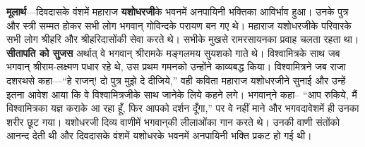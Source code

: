 \begin{sloppypar}\justifying{}
\textbf{मूलार्थ}—दिवदासके वंशमें महाराज \textbf{यशोधरजी}के भवनमें अनपायिनी भक्तिका आविर्भाव हुआ। उनके पुत्र और स्त्री सम्मत होकर सभी लोग भगवान् गोविन्दके परायण बन गए थे। महाराज यशोधरजीके परिवारके सभी लोग श्रीहरि और श्रीहरिदासोंकी सेवा करते थे। सभीके मुखसे राम\-रसायनका प्रवाह चलता रहता था। \textbf{सीतापति को सुजस} अर्थात् वे भगवान् श्रीरामके मङ्गलमय सुयशको गाते थे। विश्वामित्रके साथ जब भगवान् श्रीराम-लक्ष्मण पधार रहे थे, उस प्रथम गमनको उन्होंने काव्यबद्ध किया। विश्वामित्रने जब राजा दशरथसे कहा—“हे राजन्! दो पुत्र मुझे दे दीजिये,” वही कविता महाराज यशोधरजीने सुनाई और उन्हें इतना आवेश आया कि वे विश्वामित्रजीके साथ जानेके लिये कहने लगे। भगवान्‌ने कहा– “आप रुकिये, मैं विश्वामित्रका यज्ञ कराके आ रहा हूँ, फिर आपको दर्शन दूँगा,” पर वे नहीं माने और भगवदावेशमें ही उनका शरीर छूट गया। यशोधरजी दिव्य वाणीमें भगवान्‌की लीलाओंका गान करते थे। उनकी वाणी संतोंको आनन्द देती थी और दिवदासके वंशमें यशोधरके भवनमें अनपायिनी भक्ति प्रकट हो गई थी।
\end{sloppypar}


